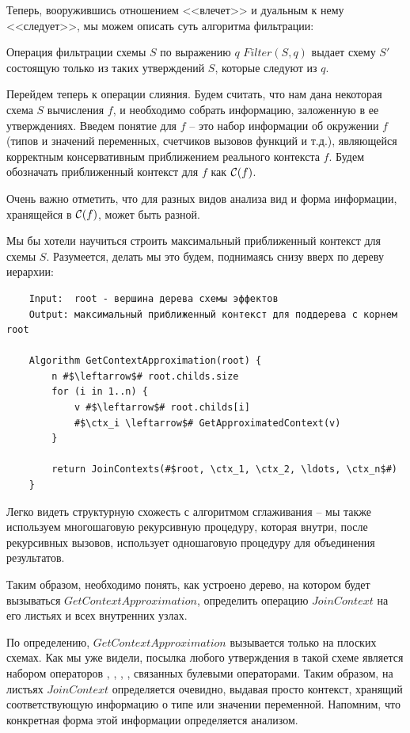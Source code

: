 Теперь, вооружившись отношением <<влечет>> и дуальным к нему <<следует>>, мы можем описать суть алгоритма фильтрации:

\begin{definition}
    Операция фильтрации схемы $S$ по выражению $q$ $Filter(S, q)$ выдает схему $S'$ состоящую только из таких утверждений $S$, которые следуют из $q$.
\end{definition}


\bigskip

Перейдем теперь к операции слияния. Будем считать, что нам дана некоторая схема $S$ вычисления $f$, и необходимо собрать информацию, заложенную в ее утверждениях. Введем понятие  для $f$ -- это набор информации об окружении $f$ (типов и значений переменных, счетчиков вызовов функций и т.д.), являющейся корректным консервативным приближением реального контекста $f$. Будем обозначать приближенный контекст для $f$ как $\mathcal{C}(f)$.

Очень важно отметить, что для разных видов анализа вид и форма информации, хранящейся в $\mathcal{C}(f)$, может быть разной. 

Мы бы хотели научиться строить максимальный приближенный контекст для схемы $S$. Разумеется, делать мы это будем, поднимаясь снизу вверх по дереву иерархии:

\begin{verbatim}
	Input:  root - вершина дерева схемы эффектов
	Output: максимальный приближенный контекст для поддерева с корнем root
	
	Algorithm GetContextApproximation(root) {
		n #$\leftarrow$# root.childs.size
		for (i in 1..n) {
			v #$\leftarrow$# root.childs[i]
			#$\ctx_i \leftarrow$# GetApproximatedContext(v)
		}
		
		return JoinContexts(#$root, \ctx_1, \ctx_2, \ldots, \ctx_n$#)
	}
\end{verbatim}

Легко видеть структурную схожесть с алгоритмом сглаживания -- мы также используем многошаговую рекурсивную процедуру, которая внутри, после рекурсивных вызовов, использует одношаговую процедуру для объединения результатов.

Таким образом, необходимо понять, как устроено дерево, на котором будет вызываться $GetContextApproximation$, определить операцию $JoinContext$ на его листьях и всех внутренних узлах.

По определению, $GetContextApproximation$ вызывается только на плоских схемах. Как мы уже видели, посылка любого утверждения в такой схеме является набором операторов , \code{==}, , \code{!=}, связанных булевыми операторами. Таким образом, на листьях $JoinContext$ определяется очевидно, выдавая просто контекст, хранящий соответствующую информацию о типе или значении переменной. Напомним, что конкретная форма этой информации определяется анализом. 

